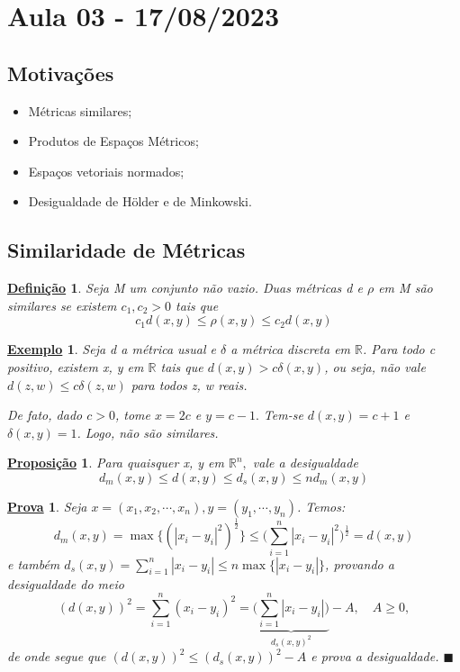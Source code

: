 \documentclass{article}
\newtheorem*{def*}{\underline{Defini\c c\~ao}}
\newtheorem*{prop*}{\underline{Proposi\c c\~ao}}
\newtheorem{example}{\underline{Exemplo}}
\newtheorem*{proof*}{\underline{Prova}}
\renewcommand\qedsymbol{$\blacksquare$}
\begin{document}
\section{Aula 03 - 17/08/2023}
\subsection{Motivações}
\begin{itemize}
  \item Métricas similares;
  \item Produtos de Espaços Métricos;
  \item Espaços vetoriais normados;
  \item Desigualdade de Hölder e de Minkowski.
\end{itemize}
\subsection{Similaridade de Métricas}
 \begin{def*}
   Seja M um conjunto não vazio. Duas métricas d e \(\rho \) em M são similares se existem \(c_{1}, c_{2} > 0\) tais que 
     \[
       c_{1}d(x, y)\leq \rho (x, y)\leq c_{2}d(x, y)
     \]
 \end{def*}
\begin{example}
  Seja d a métrica usual e \(\delta  \) a métrica discreta em \(\mathbb{R}\). Para todo c positivo, existem
x, y em \(\mathbb{R}\) tais que \(d(x, y) > c\delta (x, y)\), ou seja, não vale \(d(z, w)\leq c\delta (z, w)\) para todos
z, w reais. 

  De fato, dado \(c > 0\), tome \(x=2c\) e \(y=c-1.\) Tem-se \(d(x, y) = c + 1\) e \(\delta (x, y) = 1\). Logo, não são similares.
\end{example}
\begin{prop*}
  Para quaisquer x, y em \(\mathbb{R}^{n},\) vale a desigualdade 
    \[
      d_{m}(x,y)\leq d(x,y)\leq d_{s}(x, y)\leq nd_{m}(x,y)
    \]
\end{prop*}
\begin{proof*}
  Seja \(x=(x_{1}, x_{2}, \cdots, x_{n}), y = (y_{1}, \cdots, y_{n})\). Temos: 
    \[
      d_{m}(x, y) = \max \biggl\{(|x_{i}-y_{i}|^{2})^{\frac{1}{2}}\biggr\}\leq \biggl(\sum\limits_{i=1}^{n}|x_{i}-y_{i}|^{2}\biggr)^{\frac{1}{2}} = d(x, y)
    \]
  e também \(d_{s}(x, y) = \sum\limits_{i=1}^{n}|x_{i}-y_{i}|\leq n\max \biggl\{|x_{i}-y_{i}|\biggr\}\),
  provando a desigualdade do meio  
  \[
    (d(x,y))^{2} = \sum\limits_{i=1}^{n}(x_{i}-y_{i})^{2} = \underbrace{\biggl(\sum\limits_{i=1}^{n}|x_{i}-y_{i}|\biggr)}_{d_{s}(x, y)^{2}} - A,\quad A\geq 0,
  \]
  de onde segue que \((d(x, y))^{2}\leq (d_{s}(x, y))^{2} - A\) e prova a desigualdade. \qedsymbol
\end{proof*}
\end{document}
